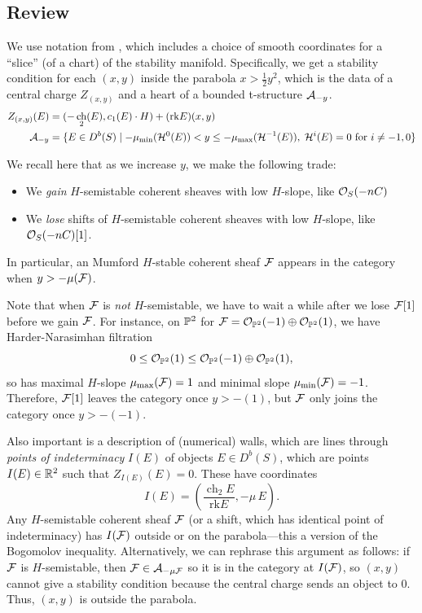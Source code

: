 \documentclass[12pt]{article}
\DeclareMathOperator{\chern}{ch}
\newcommand{\rk}{\mathrm{rk}}
\begin{document}
\subsection{Review}
We use notation from \cite{bertram_two_2026}, which includes a choice of smooth coordinates for a ``slice'' (of a chart) of the stability manifold. Specifically, we get a stability condition for each $(x,y)$ inside the parabola $x>\frac{1}{2}y^2$, which is the data of a central charge $Z_{(x,y)}$ and a heart of a bounded t-structure $\cA_{-y}$.
\begin{align*}
    Z_{(x,y)}(E) &= (-\chern_2(E), c_1(E) \cdot H) + (\rk E) (x,y)\\
    \cA_{-y} &= \{E \in D^b(S) \mid -\mu_{\min}(\cH^0(E)) < y \leq -\mu_{\max}(\cH^{-1}(E)), \; \cH^{i}(E)=0 \text{ for } i\neq -1,0\}
\end{align*}

We recall here that as we increase $y$, we make the following trade:
\begin{itemize}
    \item We \textit{gain} $H$-semistable coherent sheaves with low $H$-slope, like $\cO_S(-nC)$
    \item We \textit{lose} shifts of $H$-semistable coherent sheaves with low $H$-slope, like $\cO_S(-nC)[1]$.
\end{itemize}
In particular, an Mumford $H$-stable coherent sheaf $\cF$ appears in the category when $y>-\mu(\cF)$.

Note that when $\cF$ is \textit{not} $H$-semistable, we have to wait a while after we lose $\cF[1]$ before we gain $\cF$. For instance, on $\P^2$ for $\cF = \cO_{\P^2}(-1)\oplus \cO_{\P^2}(1)$, we have Harder-Narasimhan filtration
\[0 \leq \cO_{\P^2}(1) \leq \cO_{\P^2}(-1)\oplus\cO_{\P^2}(1),\]
so has maximal $H$-slope $\mu_{\max}(\cF) = 1$ and minimal slope $\mu_{\min}(\cF)=-1$. Therefore, $\cF[1]$ leaves the category once $y>-(1)$, but $\cF$ only joins the category once $y>-(-1)$.

Also important is a description of (numerical) walls, which are lines through \textit{points of indeterminacy} $I(E)$ of objects $E \in D^b(S)$, which are points $I(E)\in \R^2$ such that $Z_{I(E)}(E)=0$. These have coordinates
\[I(E) = \left(\frac{\chern_2 E}{\rk E}, -\mu\, E\right).\]
Any $H$-semistable coherent sheaf $\cF$ (or a shift, which has identical point of indeterminacy) has $I(\cF)$ outside or on the parabola---this a version of the Bogomolov inequality. Alternatively, we can rephrase this argument as follows: if $\cF$ is $H$-semistable, then $\cF \in \cA_{-\mu \cF}$ so it is in the category at $I(\cF)$, so $(x,y)$ cannot give a stability condition because the central charge sends an object to 0. Thus, $(x,y)$ is outside the parabola.
\end{document}

